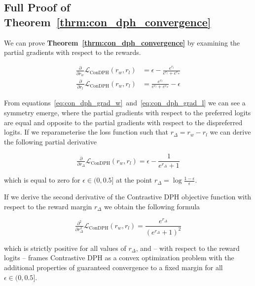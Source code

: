 \subsection{Full Proof of Theorem~\ref{thrm:con_dph_convergence}} \label{sec:con_dph_proof}

We can prove \textbf{Theorem~\ref{thrm:con_dph_convergence}} by examining the partial gradients with respect to the rewards.

\begin{subequations} \label{eq:con_dph_grad}
    \begin{alignat}{2}
    \tfrac{\partial}{\partial r_w} \mathcal{L}_\text{ConDPH}(r_w,r_l) &=
    \epsilon - \frac{e^{r_l}}{e^{r_l}+e^{r_w}} \label{eq:con_dph_grad_w} \\
    \tfrac{\partial}{\,\partial r_l\,} \mathcal{L}_\text{ConDPH}(r_w,r_l) &=
    \frac{e^{r_l}}{e^{r_l}+e^{r_w}} - \epsilon \label{eq:con_dph_grad_l}
    \end{alignat}
\end{subequations}

From equations~\ref{eq:con_dph_grad_w}~and~\ref{eq:con_dph_grad_l} we can see a symmetry emerge, where the partial gradients with respect to the preferred logits are equal and opposite to the partial gradients with respect to the dispreferred logits. If we reparameterise the loss function such that $r_{\Delta}=r_w-r_l$ we can derive the following partial derivative

\begin{equation}
    \tfrac{\partial}{\partial r_{\Delta}} \mathcal{L}_\text{ConDPH}(r_w,r_l)=
    \epsilon - \frac{1}{e^{r_{\Delta}}+1}
\end{equation}

which is equal to zero for $\epsilon \in (0,0.5]$ at the point $r_{\Delta}=\log\tfrac{1-\epsilon}{\epsilon}$.

If we derive the second derivative of the Contrastive DPH objective function with respect to the reward margin $r_{\Delta}$ we obtain the following formula

\begin{equation}
    \tfrac{\partial^2}{\partial r_{\Delta}^2} \mathcal{L}_\text{ConDPH}(r_w, r_l) =
    \frac{e^{r_{\Delta}}}{(e^{r_{\Delta}}+1)^2}
\end{equation}

which is strictly positive for all values of $r_{\Delta}$, and -- with respect to the reward logits -- frames Contrastive DPH as a convex optimization problem with the additional properties of guaranteed convergence to a fixed margin for all $\epsilon \in (0,0.5]$. %

